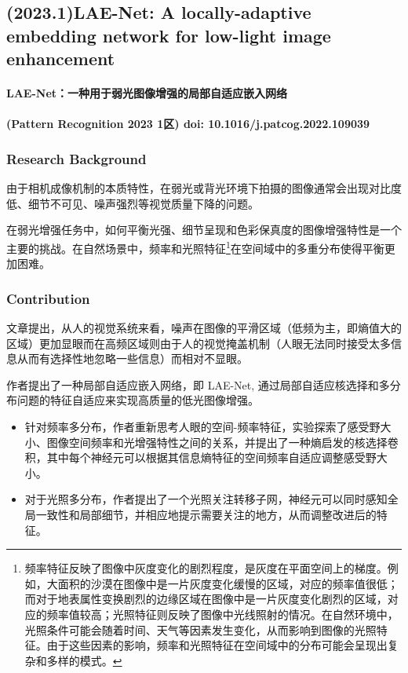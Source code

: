 \documentclass[a4paper, 10pt]{article}
\begin{document}
		\subsection{(2023.1)LAE-Net: A locally-adaptive embedding network for low-light image enhancement}
		
		\paragraph{LAE-Net：一种用于弱光图像增强的局部自适应嵌入网络}
		
		\paragraph{(Pattern Recognition 2023 1区) doi: 10.1016/j.patcog.2022.109039}
		
			\subsubsection{Research Background}
			
			由于相机成像机制的本质特性，在弱光或背光环境下拍摄的图像通常会出现对比度低、细节不可见、噪声强烈等视觉质量下降的问题。
			
			在弱光增强任务中，如何平衡光强、细节呈现和色彩保真度的图像增强特性是一个主要的挑战。在自然场景中，频率和光照特征\footnote{频率特征反映了图像中灰度变化的剧烈程度，是灰度在平面空间上的梯度。例如，大面积的沙漠在图像中是一片灰度变化缓慢的区域，对应的频率值很低；而对于地表属性变换剧烈的边缘区域在图像中是一片灰度变化剧烈的区域，对应的频率值较高；光照特征则反映了图像中光线照射的情况。在自然环境中，光照条件可能会随着时间、天气等因素发生变化，从而影响到图像的光照特征。由于这些因素的影响，频率和光照特征在空间域中的分布可能会呈现出复杂和多样的模式。}在空间域中的多重分布使得平衡更加困难。
			
			\subsubsection{Contribution}
			
			文章提出，从人的视觉系统来看，噪声在图像的平滑区域（低频为主，即熵值大的区域）更加显眼而在高频区域则由于人的视觉掩盖机制（人眼无法同时接受太多信息从而有选择性地忽略一些信息）而相对不显眼。
			
			作者提出了一种局部自适应嵌入网络，即 LAE-Net, 通过局部自适应核选择和多分布问题的特征自适应来实现高质量的低光图像增强。
			
			\begin{itemize}
				\item[(1)] 
				针对频率多分布，作者重新思考人眼的空间-频率特征，实验探索了感受野大小、图像空间频率和光增强特性之间的关系，并提出了一种熵启发的核选择卷积，其中每个神经元可以根据其信息熵特征的空间频率自适应调整感受野大小。
				
				\item[(2)]
				对于光照多分布，作者提出了一个光照关注转移子网，神经元可以同时感知全局一致性和局部细节，并相应地提示需要关注的地方，从而调整改进后的特征。
				
			\end{itemize}	
			
\end{document}
